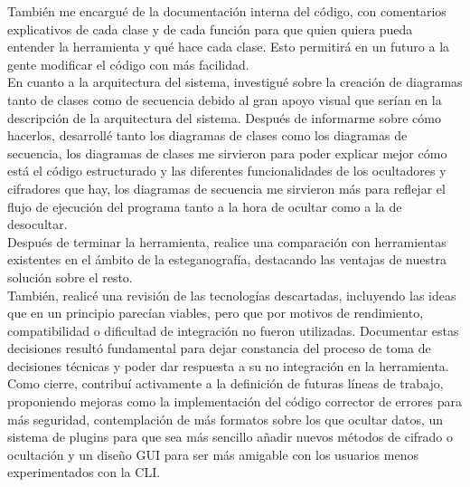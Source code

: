 También me encargué de la documentación interna del código, con comentarios explicativos de cada clase y de cada función para que quien quiera pueda entender la herramienta y qué hace cada clase. Esto permitirá en un futuro a la gente modificar el código con más facilidad. \\

En cuanto a la arquitectura del sistema, investigué sobre la creación de diagramas tanto de clases como de secuencia debido al gran apoyo visual que serían en la descripción de la arquitectura del sistema. Después de informarme sobre cómo hacerlos, desarrollé tanto los diagramas de clases como los diagramas de secuencia, los diagramas de clases me sirvieron para poder explicar mejor cómo está el código estructurado y las diferentes funcionalidades de los ocultadores y cifradores que hay, los diagramas de secuencia me sirvieron más para reflejar el flujo de ejecución del programa tanto a la hora de ocultar como a la de desocultar.\\

Después de terminar la herramienta, realice una comparación con herramientas existentes en el ámbito de la esteganografía, destacando las ventajas de nuestra solución sobre el resto. \\

También, realicé una revisión de las tecnologías descartadas, incluyendo las ideas que en un principio parecían viables, pero que por motivos de rendimiento, compatibilidad o dificultad de integración no fueron utilizadas. Documentar estas decisiones resultó fundamental para dejar constancia del proceso de toma de decisiones técnicas y poder dar respuesta a su no integración en la herramienta.\\

Como cierre, contribuí activamente a la definición de futuras líneas de trabajo, proponiendo mejoras como la implementación del código corrector de errores para más seguridad, contemplación de más formatos sobre los que ocultar datos, un sistema de plugins para que sea más sencillo añadir nuevos métodos de cifrado o ocultación y un diseño GUI para ser más amigable con los usuarios menos experimentados con la CLI.

 
